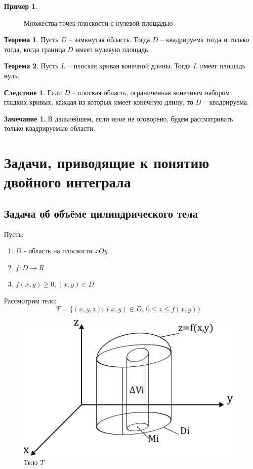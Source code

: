 \documentclass[a4paper, 14pt]{report}
\theoremstyle{definition}
\newtheorem*{note}{Замечание}
\newtheorem*{example}{Пример}
\newtheorem*{theorem}{Теорема}
\newtheorem*{implication}{Следствие}
\begin{document}
\begin{example}
\begin{figure}[!h]
\begin{subfigure}{0.35\linewidth}
					\caption{}
					\label{fig:zero_s_curve}
				\end{subfigure}
				\caption{Множества точек плоскости с нулевой площадью}
			\end{figure}
		\end{example}
		
		\begin{theorem}
			Пусть $D$ -- замкнутая область. Тогда $D$ -- квадрируема тогда и только тогда, когда граница $D$ имеет нулевую площадь.
		\end{theorem}
		\begin{theorem}
			Пусть $L$ -- плоская кривая конечной длины. Тогда $L$ имеет площадь нуль.
		\end{theorem}
		\begin{implication}
			Если $D$ -- плоская область, ограниченная конечным набором гладких кривых, каждая из которых имеет конечную длину, то $D$ -- квадрируема.
		\end{implication}
		\begin{note}
			В дальнейшем, если иное не оговорено, будем рассматривать только квадрируемые области.
		\end{note}
		
	\section{Задачи, приводящие к понятию двойного интеграла}
		\subsection{Задача об объёме цилиндрического тела}
			Пусть:
			\begin{enumerate}
				\item $D$ - область на плоскости $xOy$
				\item $f:D\rightarrow R$
				\item $f(x,y)\ge0, (x,y)\in D$
			\end{enumerate}
		
			Рассмотрим тело:
			\begin{equation}
				T=\{
					(x,y,z): 
					(x,y)\in D,~
					0\le z\le f(x,y)
				\}
			\end{equation}
		
			\begin{figure}[!ht]
				\centering
				\includegraphics[width=0.5\linewidth]{body_t}
				\caption{Тело $T$}
				\label{fig:body_t}
			\end{figure}
		
\end{document}

